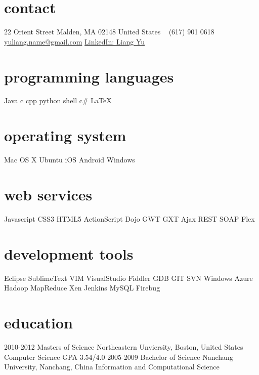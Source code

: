 \documentclass[]{ly-cv} %
\begin{document}
\begin{aside} %
\section{contact}
22 Orient Street
Malden, MA 02148
United States
~
(617) 901 0618
~
\href{mailto:yuliang.name@gmail.com}{yuliang.name@gmail.com}
\href{http://www.linkedin.com/in/liangyu2012neu}{LinkedIn: Liang Yu}
\section{programming languages}
Java c cpp python
shell c\# \LaTeX
\section{operating system}
Mac OS X Ubuntu iOS
Android Windows
\section{web services}
Javascript 
CSS3 HTML5 ActionScript
Dojo GWT GXT Ajax
REST SOAP Flex
\section{development tools}
Eclipse SublimeText VIM
VisualStudio Fiddler GDB
GIT SVN Windows Azure
Hadoop MapReduce Xen
Jenkins MySQL Firebug
\end{aside}


\section{education}

\begin{entrylist}
\entry
{2010-2012}
{Masters of Science} 
{Northeastern Unviersity, Boston, United States}
{Computer Science \hspace{4mm} \footnotesize{GPA 3.54/4.0}}
\entry
{2005-2009}
{Bachelor of Science}
{Nanchang University, Nanchang, China}
{Information and Computational Science}
\end{entrylist}
\end{document}
